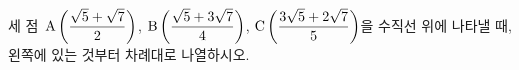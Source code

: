 세 점~$\mathrm{A}\left(\dfrac{\sqrt{5}+\sqrt{7}}{2}\right)$, $\mathrm{B}\left(\dfrac{\sqrt{5}+3\sqrt{7}}{4}\right)$, $\mathrm{C}\left(\dfrac{3\sqrt{5}+2\sqrt{7}}{5}\right)$을 수직선 위에 나타낼 때, 왼쪽에 있는 것부터 차례대로 나열하시오.
